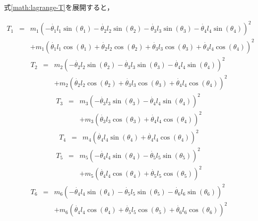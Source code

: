 式\ref{math:lagrange-T}を展開すると，

\begin{eqnarray}
        T_1 &=& m_{1} \left(- \dot{\theta_1} l_{1} \sin{\left(\theta_1 \right)} - \dot{\theta_2} l_{2} \sin{\left(\theta_2 \right)} - \dot{\theta_3} l_{3} \sin{\left(\theta_3 \right)} - \dot{\theta_4} l_{4} \sin{\left(\theta_4 \right)}\right)^{2} \nonumber \\
            & & + m_{1} \left(\dot{\theta_1} l_{1}\cos{\left(\theta_1 \right)} + \dot{\theta_2} l_{2} \cos{\left(\theta_2 \right)} + \dot{\theta_3} l_{3} \cos{\left(\theta_3 \right)} + \dot{\theta_4} l_{4} \cos{\left(\theta_4 \right)}\right)^{2}
\end{eqnarray}
\begin{eqnarray}
        T_2 &=& m_{2} \left(- \dot{\theta_2} l_{2} \sin{\left(\theta_2 \right)} - \dot{\theta_3} l_{3} \sin{\left(\theta_3 \right)} - \dot{\theta_4} l_{4} \sin{\left(\theta_4 \right)}\right)^{2} \nonumber \\
            & & + m_{2} \left(\dot{\theta_2} l_{2} \cos{\left(\theta_2 \right)} + \dot{\theta_3} l_{3}\cos{\left(\theta_3 \right)} + \dot{\theta_4} l_{4} \cos{\left(\theta_4 \right)}\right)^{2} 
\end{eqnarray}
\begin{eqnarray}
        T_3 &=& m_{3} \left(- \dot{\theta_3} l_{3} \sin{\left(\theta_3 \right)} - \dot{\theta_4} l_{4} \sin{\left(\theta_4 \right)}\right)^{2} \nonumber \\
            & & + m_{3} \left(\dot{\theta_3} l_{3} \cos{\left(\theta_3 \right)} + \dot{\theta_4} l_{4} \cos{\left(\theta_4 \right)}\right)^{2}
\end{eqnarray}
\begin{eqnarray}
        T_4 &=& m_{4} \left(\dot{\theta_4} l_{4} \sin{\left(\theta_4 \right)} + \dot{\theta_4} l_{4} \cos{\left(\theta_4 \right)}\right)^{2}
\end{eqnarray}
\begin{eqnarray}
        T_5 &=& m_{5} \left(- \dot{\theta_4} l_{4} \sin{\left(\theta_4 \right)} - \dot{\theta_5} l_{5} \sin{\left(\theta_5 \right)}\right)^{2} \nonumber \\
            & & + m_{5} \left(\dot{\theta_4} l_{4} \cos{\left(\theta_4 \right)} + \dot{\theta_5} l_{5} \cos{\left(\theta_5 \right)}\right)^{2}
\end{eqnarray}
\begin{eqnarray}
        T_6 &=& m_{6} \left(- \dot{\theta_4} l_{4} \sin{\left(\theta_4 \right)} - \dot{\theta_5} l_{5} \sin{\left(\theta_5 \right)} - \dot{\theta_6} l_{6} \sin{\left(\theta_6 \right)}\right)^{2} \nonumber \\
            & & + m_{6} \left(\dot{\theta_4} l_{4} \cos{\left(\theta_4 \right)} + \dot{\theta_5} l_{5}\cos{\left(\theta_5 \right)} + \dot{\theta_6} l_{6} \cos{\left(\theta_6 \right)}\right)^{2}
\end{eqnarray}

